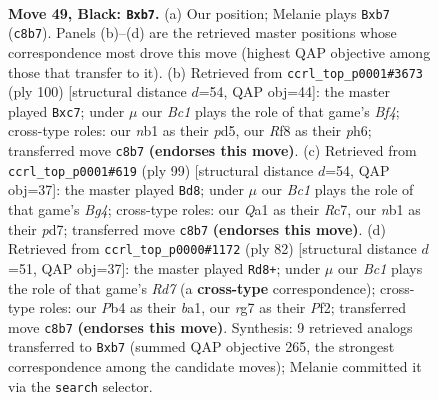 \documentclass[11pt]{article}
\begin{document}
\clearpage

\begin{figure}[p]\centering
\begin{subfigure}{0.46\textwidth}\centering
\resizebox{\linewidth}{!}{%
\newchessgame
\chessboard[
  setfen={2bk1r2/pP4Rp/8/4nP2/1p1p4/8/4P3/qNK5 b - - 0 49},
  showmover=false,
  pgfstyle=straightmove, color=movearrow, markmove={c8-b7}
]}
\caption{}
\end{subfigure}\hfill
\begin{subfigure}{0.46\textwidth}\centering
\resizebox{\linewidth}{!}{%
\newchessgame
\chessboard[
  setfen={7k/1pb3r1/4P2p/3p1p2/3Q1B2/P6P/1P2r3/7K w - - 1 51},
  showmover=false,
  pgfstyle=straightmove, color=movearrow, markmove={f4-c7}
]}
\caption{}
\end{subfigure}
\\[4pt]
\begin{subfigure}{0.46\textwidth}\centering
\resizebox{\linewidth}{!}{%
\newchessgame
\chessboard[
  setfen={7k/p1rP4/7p/5Nb1/7P/1p6/1R2K1P1/8 b - - 0 50},
  showmover=false,
  pgfstyle=straightmove, color=movearrow, markmove={g5-d8}
]}
\caption{}
\end{subfigure}\hfill
\begin{subfigure}{0.46\textwidth}\centering
\resizebox{\linewidth}{!}{%
\newchessgame
\chessboard[
  setfen={6k1/3R3p/2rN2p1/p1n5/P1p3P1/4B2P/5P2/b4K2 w - - 5 42},
  showmover=false,
  pgfstyle=straightmove, color=movearrow, markmove={d7-d8}
]}
\caption{}
\end{subfigure}
\caption{\textbf{Move 49, Black: \texttt{Bxb7}.} (a) Our position; Melanie plays \texttt{Bxb7} (\texttt{c8b7}). Panels (b)--(d) are the retrieved master positions whose correspondence most drove this move (highest QAP objective among those that transfer to it). (b) Retrieved from \texttt{ccrl\_top\_p0001\#3673} (ply 100) [structural distance $d$=54, QAP obj=44]: the master played \texttt{Bxc7}; under $\mu$ our \emph{Bc1} plays the role of that game's \emph{Bf4}; cross-type roles: our \emph{n}b1 as their \emph{p}d5, our \emph{R}f8 as their \emph{p}h6; transferred move \texttt{c8b7} \textbf{(endorses this move)}. (c) Retrieved from \texttt{ccrl\_top\_p0001\#619} (ply 99) [structural distance $d$=54, QAP obj=37]: the master played \texttt{Bd8}; under $\mu$ our \emph{Bc1} plays the role of that game's \emph{Bg4}; cross-type roles: our \emph{Q}a1 as their \emph{R}c7, our \emph{n}b1 as their \emph{p}d7; transferred move \texttt{c8b7} \textbf{(endorses this move)}. (d) Retrieved from \texttt{ccrl\_top\_p0000\#1172} (ply 82) [structural distance $d$=51, QAP obj=37]: the master played \texttt{Rd8+}; under $\mu$ our \emph{Bc1} plays the role of that game's \emph{Rd7} (a \textbf{cross-type} correspondence); cross-type roles: our \emph{P}b4 as their \emph{b}a1, our \emph{r}g7 as their \emph{P}f2; transferred move \texttt{c8b7} \textbf{(endorses this move)}. Synthesis: 9 retrieved analogs transferred to \texttt{Bxb7} (summed QAP objective 265, the strongest correspondence among the candidate moves); Melanie committed it via the \texttt{search} selector.}
\label{fig:thought-m97}
\end{figure}
\end{document}
